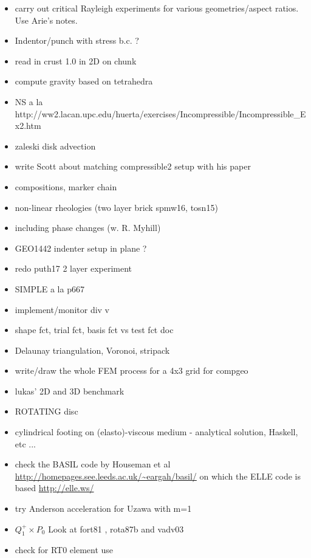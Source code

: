 \begin{itemize}
\item carry out critical Rayleigh experiments for various geometries/aspect ratios. Use Arie's notes. 
\item Indentor/punch with stress b.c. ?
\item read in crust 1.0 in 2D on chunk
\item compute gravity based on tetrahedra
\item NS a la http://ww2.lacan.upc.edu/huerta/exercises/Incompressible/Incompressible\_Ex2.htm
\item zaleski disk advection
\item write Scott about matching compressible2 setup with his paper
\item compositions, marker chain
\item non-linear rheologies (two layer brick spmw16, tosn15) 
\item including phase changes (w. R. Myhill)
\item GEO1442 indenter setup in plane ?
\item redo puth17 2 layer experiment
\item SIMPLE a la p667 \cite{john16} 
\item implement/monitor div v
\item shape fct, trial fct, basis fct vs test fct doc
\item Delaunay triangulation, Voronoi, stripack
\item write/draw the whole FEM process for a 4x3 grid for compgeo
\item lukas' 2D and 3D benchmark
\item ROTATING disc
\item cylindrical footing on (elasto)-viscous medium - analytical solution, Haskell, etc ...
\item check the BASIL code by Houseman et al \url{http://homepages.see.leeds.ac.uk/~eargah/basil/}
on which the ELLE code is based \url{http://elle.ws/} 
\item try Anderson acceleration for Uzawa \cite{hoow17} with m=1
\item $Q_1^+ \times P_0$ Look at fort81 , rota87b and vadv03
\item check \cite{bufm19} for RT0 element use

\end{itemize}
